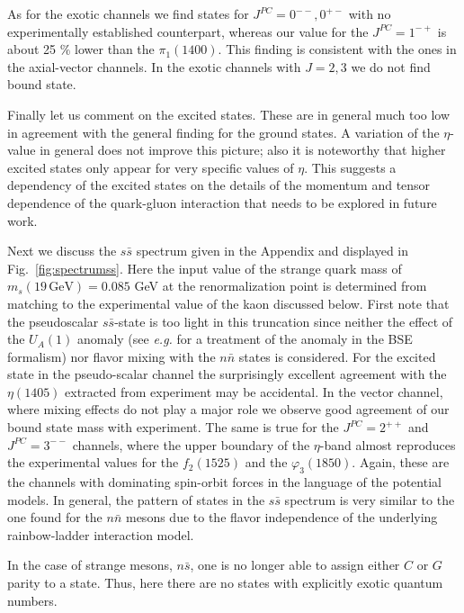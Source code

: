 As for the exotic channels we find states for $J^{PC}=0^{--},0^{+-}$ with no experimentally established
counterpart, whereas our value for the $J^{PC}=1^{-+}$ is about 25 $\%$ lower than the $\pi_1(1400)$.
This finding is consistent with the ones in the axial-vector channels. In the exotic channels
with $J=2,3$ we do not find bound state.

Finally let us comment on the excited states. These are in general much too low \cite{Holl:2004fr}
in agreement with the general finding for the ground states. A variation of the $\eta$-value
in general does not improve this picture; also it is noteworthy that higher excited states only
appear for very specific values of $\eta$. This suggests a dependency of the excited states on 
the details of the momentum and tensor dependence of the quark-gluon interaction that needs to be explored 
in future work. 

Next we discuss the $s\bar{s}$ spectrum given in the Appendix and displayed in Fig.~\ref{fig:spectrumss}.
Here the input value of the strange quark mass of $m_s(19 \,\mbox{GeV}) = 0.085$ GeV at the renormalization
point is determined from matching to the experimental value of the kaon discussed below.
First note that the pseudoscalar $s\bar{s}$-state is too light in this truncation since neither the 
effect of the $U_A(1)$ anomaly (see {\it e.g.} \cite{Alkofer:2008et} for a treatment of the anomaly
in the BSE formalism) nor flavor mixing with the $n\bar{n}$ states is considered. For the excited 
state in the pseudo-scalar channel the surprisingly excellent agreement with the $\eta(1405)$ extracted from
experiment may be accidental. In the vector channel, where mixing effects do not play a major role we
observe good agreement of our bound state mass with experiment. The same is true for the $J^{PC}=2^{++}$
and $J^{PC}=3^{--}$ channels, where the upper boundary of the $\eta$-band almost reproduces the
experimental values for the $f_2(1525)$ and the $\varphi_3(1850)$. Again, these are the channels
with dominating spin-orbit forces in the language of the potential models. In general, the pattern of
states in the $s\bar{s}$ spectrum is very similar to the one found for the $n\bar{n}$ mesons due
to the flavor independence of the underlying rainbow-ladder interaction model. 

%
%
%
%
%
%
In the case of strange mesons, $n\bar{s}$, one is no longer able to assign either $C$ or $G$ 
parity to a state. Thus, here there are no states with explicitly exotic quantum numbers.

